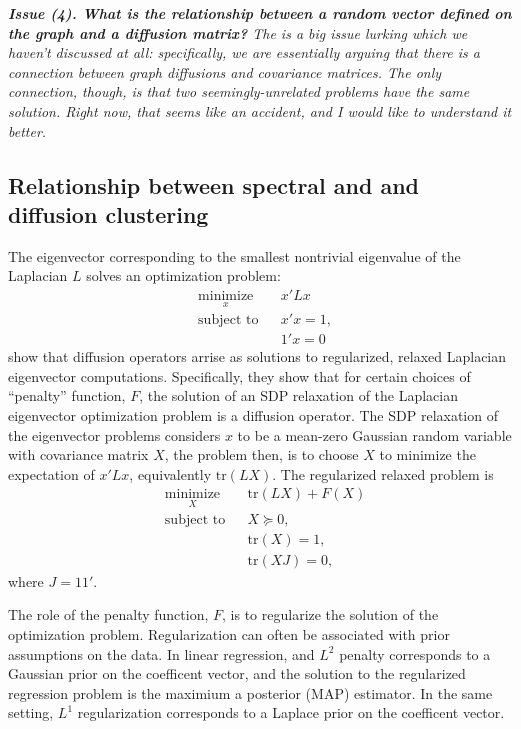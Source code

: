 \documentclass{article}
\begin{document}
\textit{\textbf{Issue (4).  What is the relationship between a random vector defined on the graph and a diffusion matrix?} The is a big issue lurking which we haven't discussed at all: specifically, we are essentially arguing that there is a connection between graph diffusions and covariance matrices.  The only connection, though, is that two seemingly-unrelated problems have the same solution.  Right now, that seems like an accident, and I would like to understand it better.}



\subsection{Relationship between spectral and and diffusion clustering}

The eigenvector corresponding to the smallest nontrivial eigenvalue of
the Laplacian $L$ solves an optimization problem:
\[
\begin{aligned}
  & \underset{x}{\text{minimize}}
  & & x' L x \\
  & \text{subject to}
  & & x' x = 1, \\
  & & & 1' x = 0
\end{aligned}
\]
\cite{mahoney2010implementing} show that diffusion operators arrise as
solutions to regularized, relaxed Laplacian eigenvector computations.
Specifically, they show that for certain choices of ``penalty''
function, $F$, the solution of an SDP relaxation of the Laplacian
eigenvector optimization problem is a diffusion operator.  The SDP
relaxation of the eigenvector problems considers $x$ to be a mean-zero
Gaussian random variable with covariance matrix $X$, the problem then, is to choose $X$ to minimize the expectation of $x' L x$, equivalently $\mathrm{tr}(L X)$.  The regularized relaxed problem is
\[
\begin{aligned}
  & \underset{X}{\text{minimize}}
  & & \mathrm{tr}(LX) + F(X) \\
  & \text{subject to}
  & & X \succeq 0, \\
  & & & \mathrm{tr}(X) = 1, \\
  & & & \mathrm{tr}(X J) = 0,
\end{aligned}
\]
where $J = 1 1'$.

The role of the penalty function, $F$, is to regularize the solution of the optimization problem.  Regularization can often be associated with prior assumptions on the data.  In linear regression, and $L^2$ penalty corresponds to a Gaussian prior on the coefficent vector, and the solution to the regularized regression problem is the maximium a posterior (MAP) estimator.  In the same setting, $L^1$ regularization corresponds to a Laplace prior on the coefficent vector.
\end{document}
